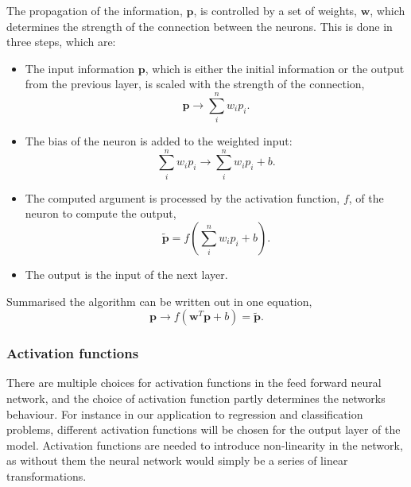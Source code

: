 \documentclass[a4paper, 
amsfonts, 
amssymb, 
amsmath, 
reprint, 
showkeys, 
nofootinbib, 
twoside]{revtex4-2}
\begin{document}
The propagation of the information, $\mathbf{p}$, is controlled by a set of weights, $\mathbf{w}$, which determines the strength of the connection between the neurons. This is done in three steps, which are:
\begin{itemize}
    \item The input information $\mathbf{p}$, which is either the initial information or the output from the previous layer, is scaled with the strength of the connection,
    \begin{equation}
        \mathbf{p} \longrightarrow \sum_i^n w_i p_i.
    \end{equation}
    
    \item The bias of the neuron is added to the weighted input:
    \begin{equation}
        \sum_i^n w_i p_i \longrightarrow \sum_i^n w_i p_i + b.
    \end{equation}
    \item The computed argument is processed by the activation function, $f$, of the neuron to compute the output,
    \begin{equation}
        \tilde{\mathbf{p}} = f \left( \sum_i^n w_i p_i + b \right).
    \end{equation}
    \item The output is the input of the next layer.
\end{itemize}

Summarised the algorithm can be written out in one equation,
\begin{equation}
    \mathbf{p} \longrightarrow f(\mathbf{w}^T \mathbf{p} + b) = \tilde{\mathbf{p}}.
\end{equation} 

\subsubsection{Activation functions}

There are multiple choices for activation functions in the feed forward neural network, and the choice of activation function partly determines the networks behaviour. For instance in our application to regression and classification problems, different activation functions will be chosen for the output layer of the model. Activation functions are needed to introduce non-linearity in the network, as without them the neural network would simply be a series of linear transformations. 
\end{document}
